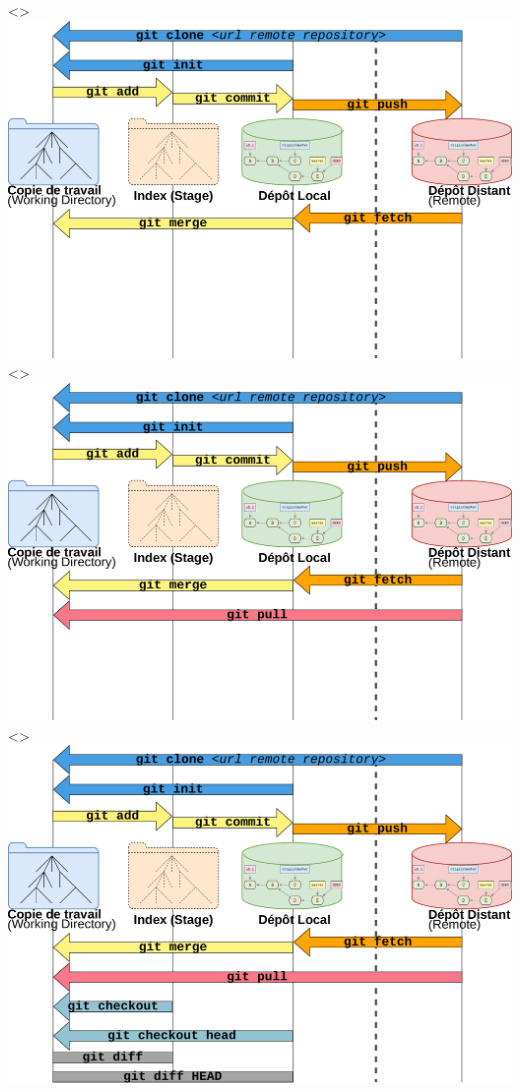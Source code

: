\documentclass[table,tikz,12pt,svgnames]{beamer}
\begin{document}
\begin{frame}
\begin{adjustwidth}{-0.75cm}{0cm}{}
\begin{center}
			\only<\value{numSlide}>{{\includegraphics[scale=0.44]{images/workflow7.pdf}}}
			\only<\value{numSlide}>{{\includegraphics[scale=0.44]{images/workflow8.pdf}}}
		\fi
		\only<\value{numSlide}>{{\includegraphics[scale=0.44]{images/workflow_all.pdf}}}
	\end{center}
\end{adjustwidth}
\end{frame}
\end{document}
